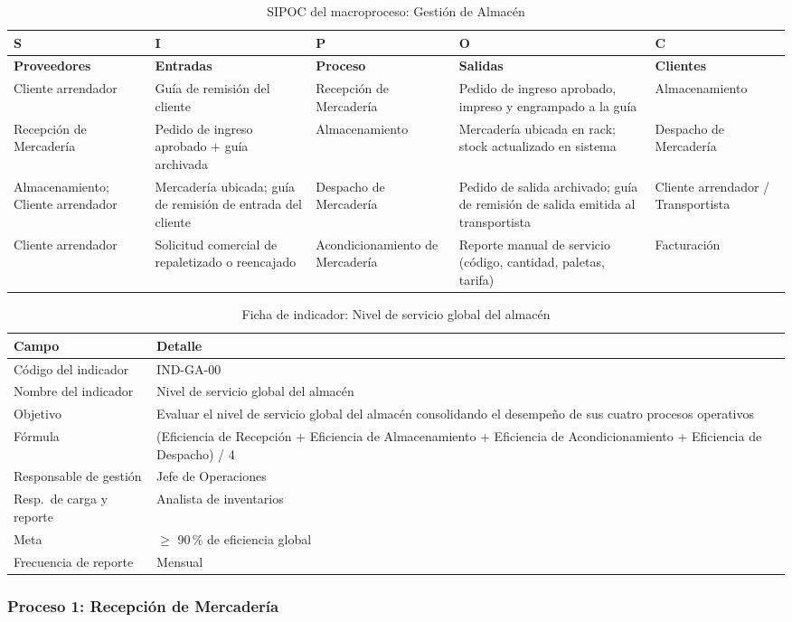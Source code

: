 \documentclass[11pt, a4paper, oneside]{report}
\newcommand{\fichaIndicador}[8]{%
  \begin{table}[H]
  \centering\small
  \renewcommand{\arraystretch}{1.25}
  \setlength{\tabcolsep}{6pt}
  \begin{tabularx}{\textwidth}{|>{\raggedright\arraybackslash}p{0.28\textwidth}|>{\raggedright\arraybackslash}X|}
  \hline
  \rowcolor{upeu_mid}
  \color{white}\bfseries Campo & \color{white}\bfseries Detalle \\ \hline
  \rowcolor{gray!10}
  Código del indicador & #1 \\ \hline
  Nombre del indicador & #2 \\ \hline
  \rowcolor{gray!10}
  Objetivo & #3 \\ \hline
  Fórmula & #4 \\ \hline
  \rowcolor{gray!10}
  Responsable de gestión & #5 \\ \hline
  Resp.\ de carga y reporte & #6 \\ \hline
  \rowcolor{gray!10}
  Meta & #7 \\ \hline
  Frecuencia de reporte & #8 \\ \hline
  \end{tabularx}
  \caption{Ficha de indicador: #2}
  \end{table}%
}
\begin{document}
\begin{table}[H]
\centering\small
\renewcommand{\arraystretch}{1.3}
\setlength{\tabcolsep}{4pt}
\begin{tabularx}{\textwidth}{|>{\raggedright\arraybackslash}p{}|>{\raggedright\arraybackslash}p{}|>{\raggedright\arraybackslash}p{}|>{\raggedright\arraybackslash}p{}|>{\raggedright\arraybackslash}X|}
\hline
\rowcolor{upeu_dark}
\color{white}\bfseries S & \color{white}\bfseries I & \color{white}\bfseries P & \color{white}\bfseries O & \color{white}\bfseries C \\ \hline
\rowcolor{upeu_light}
\bfseries Proveedores & \bfseries Entradas & \bfseries Proceso & \bfseries Salidas & \bfseries Clientes \\ \hline
Cliente arrendador &
Guía de remisión del cliente &
Recepción de Mercadería &
Pedido de ingreso aprobado, impreso y engrampado a la guía &
Almacenamiento \\ \hline
\rowcolor{gray!10}
Recepción de Mercadería &
Pedido de ingreso aprobado + guía archivada &
Almacenamiento &
Mercadería ubicada en rack; stock actualizado en sistema &
Despacho de Mercadería \\ \hline
Almacenamiento; Cliente arrendador &
Mercadería ubicada; guía de remisión de entrada del cliente &
Despacho de Mercadería &
Pedido de salida archivado; guía de remisión de salida emitida al transportista &
Cliente arrendador / Transportista \\ \hline
\rowcolor{gray!10}
Cliente arrendador &
Solicitud comercial de repaletizado o reencajado &
Acondicionamiento de Mercadería &
Reporte manual de servicio (código, cantidad, paletas, tarifa) &
Facturación \\ \hline
\end{tabularx}
\caption{SIPOC del macroproceso: Gestión de Almacén}
\end{table}

\fichaIndicador
  {IND-GA-00}
  {Nivel de servicio global del almacén}
  {Evaluar el nivel de servicio global del almacén consolidando el desempeño de sus cuatro procesos operativos}
  {(Eficiencia de Recepción + Eficiencia de Almacenamiento + Eficiencia de Acondicionamiento + Eficiencia de Despacho) / 4}
  {Jefe de Operaciones}
  {Analista de inventarios}
  {$\geq$ 90\,\% de eficiencia global}
  {Mensual}

\subsubsection{Proceso 1: Recepción de Mercadería}
\end{document}
